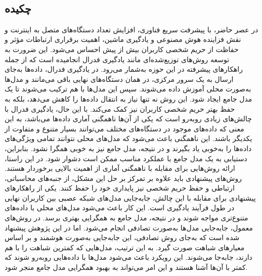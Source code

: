 
\setcounter{page}{1}
\thispagestyle{empty}

~\vfill

\subsection*{چکیده}
\begin{small}
\baselineskip=0.7cm

در عصر حاضر، با پیشرفت سریع فناوری، افزایش تعداد دستگاه‌های متصل به اینترنت و نقش فزاینده هوش مصنوعی و یادگیری ماشین، اهمیت برقراری ارتباطات مؤثر و حفاظت از حریم شخصی کاربران بیش از پیش احساس می‌شود. این ضرورت به توسعه روش‌های توزیع‌شده‌ای مانند یادگیری فدرال انجامیده است که از جمله راهکارهای پیشرفته در این حوزه به‌شمار می‌رود. در یادگیری فدرال، داده‌ها به‌جای ارسال به یک سرور مرکزی، در همان دستگاه‌های نهایی باقی می‌مانند و مدل‌ها به‌صورت محلی آموزش داده می‌شوند. سپس این مدل‌ها با هم ترکیب می‌شوند تا یک مدل جامع ایجاد شود. این روش نه تنها نیاز به انتقال داده‌ها را کاهش می‌دهد، بلکه به حفظ بهتر حریم شخصی کاربران نیز کمک می‌کند.
با این حال، یادگیری فدرال با چالش‌های زیادی روبه‌رو است که یکی از آن‌ها ناهمگنی آماری داده‌ها می‌باشد، به این معنی که داده‌های موجود در دستگاه‌های مختلف می‌توانند بسیار متنوع و متفاوت از یکدیگر باشند. این ناهمگنی باعث می‌شود که مدل‌های محلی نتوانند تمامی ویژگی‌های داده‌ها را به‌خوبی یاد بگیرند و در نتیجه، مدل جامع نیز به خوبی همگرا نشود. بنابراین، دستیابی به یک مدل جامع با عملکرد مناسب ممکن است دشوار شود. در این راستا، ارائه روش‌هایی برای مقابله با ناهمگنی آماری از اهمیت بالایی برخوردار هستند. روش‌های پیشنهادی باید علاوه بر تمرکز بر حل این مشکل، از جنبه‌های محاسباتی، ارتباطی و حفظ حریم شخصی نیز پایداری خود را حفظ کنند.
یکی از راهکارهای پیشنهادی برای مقابله با این چالش، جابه‌جایی مدل‌های شبکه عصبی بین کاربران نهایی در طول فرآیند یادگیری است. این کار باعث می‌شود مدل‌های محلی با داده‌های متنوع‌تری مواجه شوند و در نتیجه، مدل جامع به همگرایی بهتری برسد. در روش‌های معمول، جابه‌جایی مدل‌ها به‌صورت تصادفی انجام می‌شود. اما در این پژوهش پیشنهاد شده است که به‌جای روش تصادفی، این جابه‌جایی به‌صورت هوشمند و بر اساس معیارهای شباهت صورت گیرد. به این ترتیب، مدل‌هایی که کمترین شباهت را با هم دارند، جابه‌جا می‌شوند. این رویکرد باعث می‌شود مدل‌ها با داده‌هایی روبه‌رو شوند که کمتر با آن‌ها آشنا هستند و این امر می‌تواند به بهبود همگرایی مدل جامع منجر شود.

\end{small}
